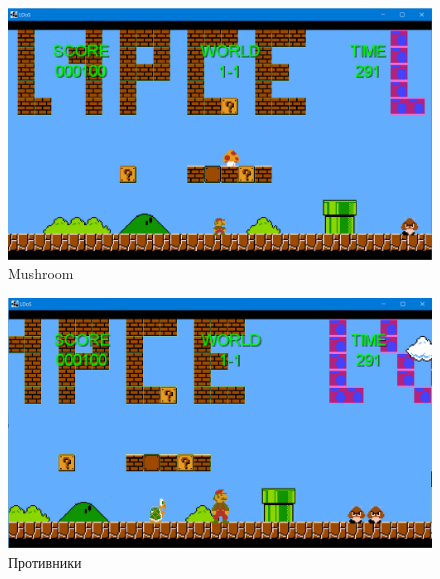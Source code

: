 \begin{figure}[H]
	\begin{center}
		\includegraphics[scale=0.7]{pics/Screenshot_7.png}
		\caption{Mushroom} 
		\label{pic:pic_name} %
	\end{center}
\end{figure}


\begin{figure}[H]
	\begin{center}
		\includegraphics[scale=0.7]{pics/Screenshot_8.png}
		\caption{Противники} 
		\label{pic:pic_name} %
	\end{center}
\end{figure}
 
